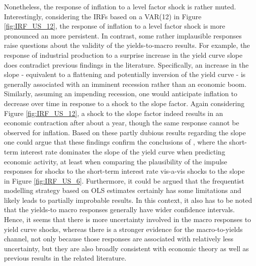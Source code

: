 Nonetheless, the response of inflation to a level factor shock is rather muted.
Interestingly, considering the IRFs based on a VAR(12) in Figure \ref{fig:IRF_US_12}, the response of inflation to a level factor shock is more pronounced an more persistent. 
In contrast, some rather implausible responses raise questions about the validity of the yields-to-macro results. 
For example, the response of industrial production to a surprise increase in the yield curve slope does contradict previous findings in the literature. 
Specifically, an increase in the slope - equivalent to a flattening and potentially inversion of the yield curve - is generally associated with an imminent recession rather than an economic boom. 
Similarly, assuming an impending recession, one would anticipate inflation to decrease over time in response to a shock to the slope factor.
Again considering Figure \ref{fig:IRF_US_12}, a shock to the slope factor indeed results in an economic contraction after about a year, though the same response cannot be observed for inflation. 
Based on these partly dubious results regarding the slope one could argue that these findings confirm the conclusions of \citet{ang2006does}, where the short-term interest rate dominates the slope of the yield curve when predicting economic activity, at least when comparing the plausibility of the impulse responses for shocks to the short-term interest rate vis-a-vis shocks to the slope in Figure \ref{fig:IRF_US_6}. 
Furthermore, it could be argued that the frequentist modelling strategy based on OLS estimates certainly has some limitations and likely leads to partially improbable results. 
In this context, it also has to be noted that the yields-to macro responses generally have wider confidence intervals. Hence, it seems that there is more uncertainty involved in the macro responses to yield curve shocks, whereas there is a stronger evidence for the macro-to-yields channel, not only because those responses are associated with relatively less uncertainty, but they are also broadly consistent with economic theory as well as previous results in the related literature. 



